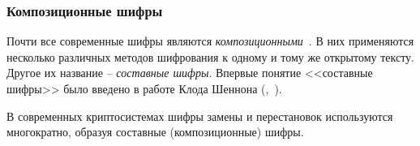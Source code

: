 \subsubsection{Композиционные шифры}

Почти все современные шифры являются \emph{композиционными}~\cite{AlZKCh:2001}. В них применяются несколько различных методов шифрования к одному и тому же открытому тексту. Другое их название -- \emph{составные шифры}. Впервые понятие <<составные шифры>> было введено в работе Клода Шеннона (,~\cite{Shannon:1949:CTS}).

В современных криптосистемах шифры замены и перестановок используются многократно, образуя составные (композиционные) шифры.
